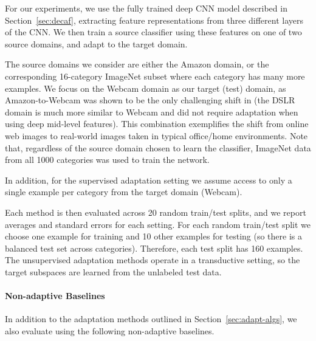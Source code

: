 For our experiments, we use the fully trained deep CNN model described in Section~\ref{sec:decaf}, extracting feature
representations from three different layers of the CNN. We then train a source classifier using these features on one of two source domains, and adapt to the target domain.

The source domains we consider are either the Amazon domain, or the corresponding 16-category ImageNet subset where each category has many more examples.
We focus on the Webcam domain as our target (test) domain, as Amazon-to-Webcam  was shown to be the only challenging shift in \cite{deeplearning-arxiv-2013} (the DSLR domain is much more similar to Webcam and did not require adaptation when using deep mid-level features). This combination exemplifies the shift from online web images to real-world images taken in typical office/home environments.
Note that, regardless of the source domain chosen to learn the classifier, ImageNet data from all 1000 categories was used to train the network. 

In addition, for the supervised adaptation setting we assume access to only a single example per category from the target domain (Webcam). 

Each method is then evaluated across 20 random train/test splits, and we report averages and standard errors for each setting. 
For each random train/test split we choose one example for training and 10 other examples for testing (so there is a balanced test set across categories). Therefore, each test split has 160 examples. The unsupervised adaptation methods operate in a transductive setting, so the target subspaces are learned from the unlabeled test data.



\paragraph{Non-adaptive Baselines}
In addition to the adaptation methods outlined in Section~\ref{sec:adapt-algs},
we also evaluate using the following non-adaptive baselines.

